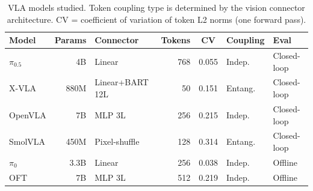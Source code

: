 \begin{table}[t]
\centering
\caption{VLA models studied. Token coupling type is determined by the vision connector architecture. CV = coefficient of variation of token L2 norms (one forward pass).}
\label{tab:model_properties}
\setlength{\tabcolsep}{3.5pt}
\footnotesize
\begin{tabular}{@{}lrlrcll@{}}
\toprule
Model & Params & Connector & Tokens & CV & Coupling & Eval \\
\midrule
$\pi_{0.5}$ & 4B & Linear & 768 & 0.055 & Indep. & Closed-loop \\
X-VLA & 880M & Linear+BART 12L & 50 & 0.151 & Entang. & Closed-loop \\
OpenVLA & 7B & MLP 3L & 256 & 0.215 & Indep. & Closed-loop \\
SmolVLA & 450M & Pixel-shuffle & 128 & 0.314 & Entang. & Closed-loop \\
\midrule
$\pi_0$ & 3.3B & Linear & 256 & 0.038 & Indep. & Offline \\
OFT & 7B & MLP 3L & 512 & 0.219 & Indep. & Offline \\
\bottomrule
\end{tabular}
\end{table}
